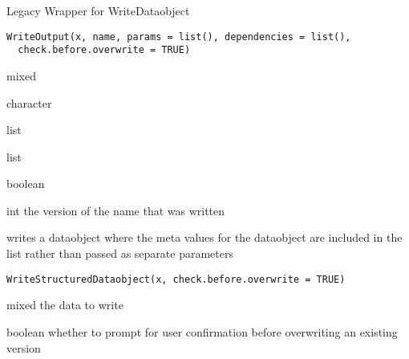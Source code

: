 \documentclass[a4paper]{book}
\begin{document}
%
\begin{Description}\relax
Legacy Wrapper for WriteDataobject
\end{Description}
%
\begin{Usage}
\begin{verbatim}
WriteOutput(x, name, params = list(), dependencies = list(),
  check.before.overwrite = TRUE)
\end{verbatim}
\end{Usage}
%
\begin{Arguments}
\begin{ldescription}
\item[\code{x}] mixed

\item[\code{name}] character

\item[\code{params}] list

\item[\code{dependencies}] list

\item[\code{check.before.overwrite}] boolean
\end{ldescription}
\end{Arguments}
%
\begin{Value}
int the version of the name that was written
\end{Value}
%
\begin{Description}\relax
writes a dataobject where the meta values for the dataobject are included in the list
rather than passed as separate parameters
\end{Description}
%
\begin{Usage}
\begin{verbatim}
WriteStructuredDataobject(x, check.before.overwrite = TRUE)
\end{verbatim}
\end{Usage}
%
\begin{Arguments}
\begin{ldescription}
\item[\code{x}] mixed the data to write

\item[\code{check.before.overwrite}] boolean whether to prompt for user confirmation before overwriting an existing version
\end{ldescription}
\end{Arguments}
\end{document}

